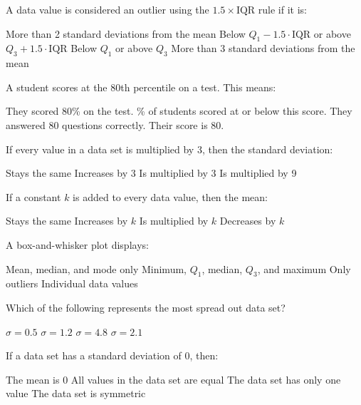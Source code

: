 \documentclass[addpoints]{exam}
\begin{document}
\begin{questions}
\question[1] A data value is considered an outlier using the $1.5 \times \text{IQR}$ rule if it is:
\begin{choices}
    \choice More than 2 standard deviations from the mean
    \correctchoice Below $Q_1 - 1.5 \cdot \text{IQR}$ or above $Q_3 + 1.5 \cdot \text{IQR}$
    \choice Below $Q_1$ or above $Q_3$
    \choice More than 3 standard deviations from the mean
\end{choices}

\question[1] A student scores at the 80th percentile on a test. This means:
\begin{choices}
    \choice They scored 80\% on the test.
    \% of students scored at or below this score.
    \choice They answered 80 questions correctly.
    \choice Their score is 80.
\end{choices}

\question[1] If every value in a data set is multiplied by 3, then the standard deviation:
\begin{choices}
    \choice Stays the same
    \choice Increases by 3
    \correctchoice Is multiplied by 3
    \choice Is multiplied by 9
\end{choices}

\question[1] If a constant $k$ is added to every data value, then the mean:
\begin{choices}
    \choice Stays the same
    \correctchoice Increases by $k$
    \choice Is multiplied by $k$
    \choice Decreases by $k$
\end{choices}

\question[1] A box-and-whisker plot displays:
\begin{choices}
    \choice Mean, median, and mode only
    \correctchoice Minimum, $Q_1$, median, $Q_3$, and maximum
    \choice Only outliers
    \choice Individual data values
\end{choices}

\question[1] Which of the following represents the most spread out data set?
\begin{choices}
    \choice $\sigma = 0.5$
    \choice $\sigma = 1.2$
    \correctchoice $\sigma = 4.8$
    \choice $\sigma = 2.1$
\end{choices}

\question[1] If a data set has a standard deviation of 0, then:
\begin{choices}
    \choice The mean is 0
    \correctchoice All values in the data set are equal
    \choice The data set has only one value
    \choice The data set is symmetric
\end{choices}


\end{questions}
\end{document}
